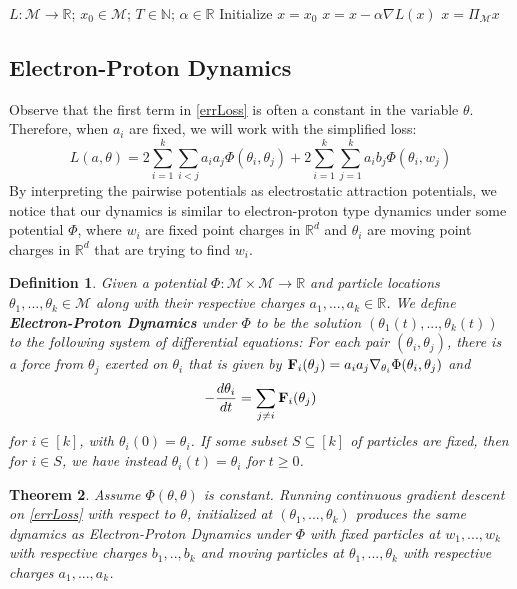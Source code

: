 \documentclass{article}
\newtheorem{theorem}{Theorem}[section]
\newtheorem{definition}[theorem]{Definition}
\newcommand{\N}{{\mathbb{N}}}
\newcommand{\R}{{\mathbb{R}}}
\begin{document}
\begin{algorithm}[hb]
 \caption{$x = GradientDescent(L,x_0, T,\alpha$)}
   \label{GD}
\begin{algorithmic}
    $L: \mathcal{M} \to \R$; $x_0 \in \mathcal{M}$; $T\in \N$; $\alpha\in \R$
   \STATE Initialize $x = x_0$
   \STATE $x = x - \alpha\nabla L(x)$
   \STATE $x = \Pi_\mathcal{M} x$
   \ENDFOR
\end{algorithmic}
\end{algorithm}

\subsection{Electron-Proton Dynamics}

Observe that the first term in \eqref{errLoss} is often a constant in the variable $\theta$. Therefore, when $a_i$ are fixed, we will work with the simplified loss:
\begin{equation}\label{errSimp}
L(a,\theta) =  2\sum_{i=1}^k\sum_{i < j} a_ia_j\Phi(\theta_i,\theta_j) + 2\sum_{i=1}^k\sum_{j=1}^ka_ib_j \Phi(\theta_i,w_j)
\end{equation}
By interpreting the pairwise potentials as electrostatic attraction potentials, we notice that our dynamics is similar to electron-proton type dynamics under some potential $\Phi$, where $w_i$ are fixed point charges in $\R^d$ and $\theta_i$ are moving point charges in $\R^d$ that are trying to find $w_i$. 

\begin{definition}\label{EPDef}
Given a potential $\Phi : \mathcal{M} \times \mathcal{M} \to \R$ and particle locations $\theta_1,...,\theta_k \in \mathcal{M}$ along with their respective charges $a_1,...,a_k \in \R$. We define {\bf Electron-Proton Dynamics} under $\Phi$ to be the solution $(\theta_1(t),...,\theta_k(t))$ to the following system of differential equations: For each pair $(\theta_i,\theta_j)$, there is a force from $\theta_j$ exerted on $\theta_i$ that is given by ${\bf F}_{i}(\theta_j) = a_ia_j\nabla_{\theta_i} \Phi(\theta_i,\theta_j)$ and
\[-\frac{d\theta_i}{dt} =  \sum_{ j \neq i} {\bf F}_{i}(\theta_j)\]
for $i \in [k]$, with $\theta_i(0) = \theta_i$. If some subset $S \subseteq [k]$ of particles are fixed, then for $i\in S$, we have instead $\theta_i(t) = \theta_i$ for $t \geq 0$.

\end{definition}


\begin{theorem}\label{EPDyn}
Assume $\Phi(\theta, \theta)$ is constant. Running continuous gradient descent on \eqref{errLoss} with respect to $\theta$, initialized at $(\theta_1,...,\theta_k)$ produces the same dynamics as Electron-Proton Dynamics under $\Phi$ with fixed particles at $w_1,...,w_k$ with respective charges $b_1,..,b_k$ and moving particles at $\theta_1,...,\theta_k$ with respective charges $a_1,...,a_k$.
\end{theorem}
\end{document}
